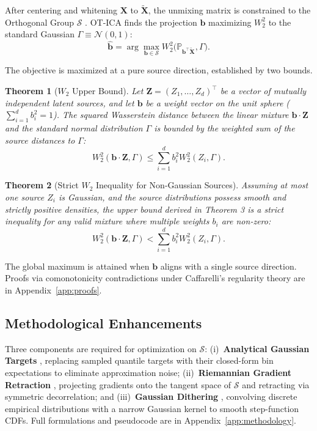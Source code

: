 \documentclass{tpm2026} %
\newtheorem{theorem}{Theorem}
\begin{document}
After centering and whitening $\mathbf{X}$ to $\widetilde{\mathbf{X}}$, the unmixing matrix is constrained to the Orthogonal Group $\mathcal{S}$ \citep{cardoso2022}. OT-ICA finds the projection $\mathbf{b}$ maximizing $W_2^2$ to the standard Gaussian $\Gamma \equiv \mathcal{N}(0,1)$:
\begin{equation}
    \hat{\mathbf{b}} = \arg\max_{\mathbf{b} \in \mathcal{S}} W_2^2\big(\mathbb{P}_{\mathbf{b}^\top \widetilde{\mathbf{X}}}, \Gamma\big).
\end{equation}

The objective is maximized at a pure source direction, established by two bounds.

\begin{theorem}[$W_2$ Upper Bound]
Let $\mathbf{Z} = (Z_1, \dots, Z_d)^\top$ be a vector of mutually independent latent sources, and let $\mathbf{b}$ be a weight vector on the unit sphere ($\sum_{i=1}^d b_i^2 = 1$). The squared Wasserstein distance between the linear mixture $\mathbf{b} \cdot \mathbf{Z}$ and the standard normal distribution $\Gamma$ is bounded by the weighted sum of the source distances to $\Gamma$:
\begin{equation}
    W_2^2(\mathbf{b} \cdot \mathbf{Z}, \Gamma) \le \sum_{i=1}^d b_i^2 W_2^2(Z_i, \Gamma).
\end{equation}
\end{theorem}

\begin{theorem}[Strict $W_2$ Inequality for Non-Gaussian Sources]
Assuming at most one source $Z_i$ is Gaussian, and the source distributions possess smooth and strictly positive densities, the upper bound derived in Theorem 3 is a strict inequality for any valid mixture where multiple weights $b_i$ are non-zero:
\begin{equation}
    W_2^2(\mathbf{b} \cdot \mathbf{Z}, \Gamma) < \sum_{i=1}^d b_i^2 W_2^2(Z_i, \Gamma).
\end{equation}
\end{theorem}

The global maximum is attained when $\mathbf{b}$ aligns with a single source direction. Proofs via comonotonicity contradictions under Caffarelli's regularity theory are in Appendix~\ref{app:proofs}.

\subsection{Methodological Enhancements}
Three components are required for optimization on $\mathcal{S}$: (i)~\textbf{Analytical Gaussian Targets} \citep{fournier2015rate}, replacing sampled quantile targets with their closed-form bin expectations to eliminate approximation noise; (ii)~\textbf{Riemannian Gradient Retraction} \citep{absil2008optimization}, projecting gradients onto the tangent space of $\mathcal{S}$ and retracting via symmetric decorrelation; and (iii)~\textbf{Gaussian Dithering} \citep{schuchman1964dither}, convolving discrete empirical distributions with a narrow Gaussian kernel to smooth step-function CDFs. Full formulations and pseudocode are in Appendix~\ref{app:methodology}.
\end{document}
